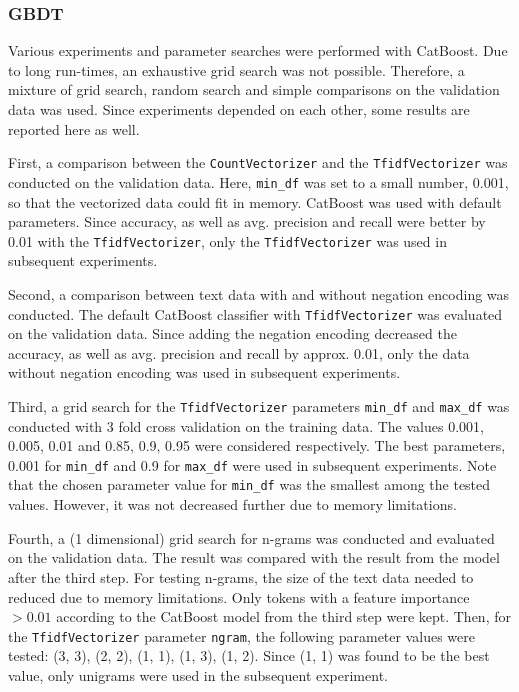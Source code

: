 \documentclass{article}
\begin{document}
	\subsubsection{GBDT}
	
	Various experiments and parameter searches were performed with CatBoost. Due to long run-times, an exhaustive grid search was not possible. Therefore, a mixture of grid search, random search and simple comparisons on the validation data was used. Since experiments depended on each other, some results are reported here as well.
	
	First, a comparison between the \lstinline{CountVectorizer} and the \lstinline{TfidfVectorizer} was conducted on the validation data. Here, \lstinline{min_df} was set to a small number, 0.001, so that the vectorized data could fit in memory. CatBoost was used with default parameters. Since accuracy, as well as avg. precision and recall were better by 0.01 with the \lstinline{TfidfVectorizer}, only the \lstinline{TfidfVectorizer} was used in subsequent experiments.
	
	Second, a comparison between text data with and without negation encoding was conducted. The default CatBoost classifier with \lstinline{TfidfVectorizer} was evaluated on the validation data. Since adding the negation encoding decreased the accuracy, as well as avg. precision and recall by approx. 0.01, only the data without negation encoding was used in subsequent experiments.
	
	Third, a grid search for the \lstinline{TfidfVectorizer} parameters \lstinline{min_df} and \lstinline{max_df} was conducted with 3 fold cross validation on the training data. The values 0.001, 0.005, 0.01 and 0.85, 0.9, 0.95 were considered	respectively. The best parameters, 0.001 for \lstinline{min_df} and 0.9 for \lstinline{max_df} were used in subsequent experiments. Note that the chosen parameter value for \lstinline{min_df} was the smallest among the tested values. However, it was not decreased further due to memory limitations.
	
	Fourth, a (1 dimensional) grid search for n-grams was conducted and evaluated on the validation data. The result was compared with the result from the model after the third step. For testing n-grams, the size of the text data needed to reduced due to memory limitations. Only tokens with a feature importance $>0.01$ according to the CatBoost model from the third step were kept. Then, for the \lstinline{TfidfVectorizer} parameter \lstinline{ngram}, the following parameter values were tested: (3, 3), (2, 2), (1, 1), 
	(1, 3), (1, 2). Since (1, 1) was found to be the best value, only unigrams were used in the subsequent experiment.
	
\end{document}
